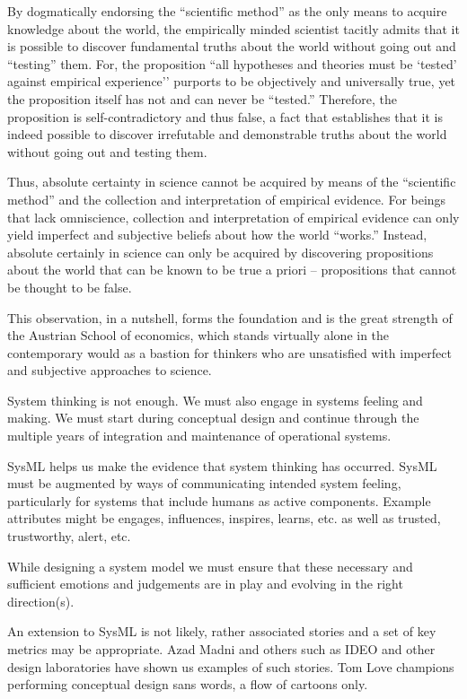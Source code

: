 By dogmatically endorsing the ``scientific method'' as the only means to acquire knowledge about the world, the empirically minded scientist tacitly admits that it is possible to discover fundamental truths about the world without going out and ``testing'' them. For, the proposition ``all hypotheses and theories must be `tested’ against empirical experience'' purports to be objectively and universally true, yet the proposition itself has not and can never be ``tested.''  Therefore, the proposition is self-contradictory and thus false, a fact that establishes that it is indeed possible to discover irrefutable and demonstrable truths about the world without going out and testing them.

Thus, absolute certainty in science cannot be acquired by means of the “scientific method” and the collection and interpretation of empirical evidence. For beings that lack omniscience, collection and interpretation of empirical evidence can only yield imperfect and subjective beliefs about how the world “works.”  Instead, absolute certainly in science can only be acquired by discovering propositions about the world that can be known to be true a priori – propositions that cannot be thought to be false.

This observation, in a nutshell, forms the foundation and is the great strength of the Austrian School of economics, which stands virtually alone in the contemporary would as a bastion for thinkers who are unsatisfied with imperfect and subjective approaches to science.

System thinking is not enough. We must also engage in systems feeling and making. We must start during conceptual design and continue through the multiple years of integration and maintenance of operational systems.

SysML helps us make the evidence that system thinking has occurred. SysML must be augmented by ways of communicating intended system feeling, particularly for systems that include humans as active components. Example attributes might be engages, influences, inspires, learns, etc. as well as trusted, trustworthy, alert, etc.

While designing a system model we must ensure that these necessary and sufficient emotions and judgements are in play and evolving in the right direction(s).

An extension to SysML is not likely, rather associated stories and a set of key metrics may be appropriate. Azad Madni and others such as IDEO and other design laboratories have shown us examples of such stories. Tom Love champions performing conceptual design sans words, a flow of cartoons only.

